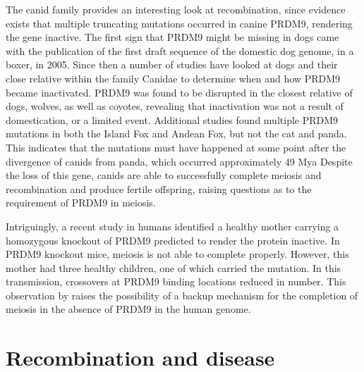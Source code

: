 The canid family provides an interesting look at recombination, since evidence exists that multiple truncating mutations occurred in canine PRDM9, rendering the gene inactive.
The first sign that PRDM9 might be missing in dogs came with the publication of the first draft sequence of the domestic dog genome, in a boxer, in 2005\cite{Lindblad-Toh2005}.
Since then a number of studies have looked at dogs and their close relative within the family Canidae to determine when and how PRDM9 became inactivated.
PRDM9 was found to be disrupted in the closest relative of dogs, wolves, as well as coyotes\cite{Munoz-Fuentes2011}, revealing that inactivation was not a result of domestication, or a limited event.
Additional studies found multiple PRDM9 mutations in both the Island Fox and Andean Fox\cite{Auton2013}, but not the cat and panda\cite{Axelsson2012}.
This indicates that the mutations must have happened at some point after the divergence of canids from panda, which occurred approximately 49 Mya\cite{Oliver2009,Axelsson2012}
Despite the loss of this gene, canids are able to successfully complete meiosis and recombination and produce fertile offspring, raising questions as to the requirement of PRDM9 in meiosis.


Intriguingly, a recent study in humans identified a healthy mother carrying a homozygous knockout of PRDM9 predicted to render the protein inactive\cite{Narasimhan2016}.
In PRDM9 knockout mice, meiosis is not able to complete properly\cite{Brick2012}.
However, this mother had three healthy children, one of which carried the mutation.
In this transmission, crossovers at PRDM9 binding locations reduced in number.
This observation by \citet{Narasimhan2016} raises the possibility of a backup mechanism for the completion of meiosis in the absence of PRDM9 in the human genome.





\section{Recombination and disease}


